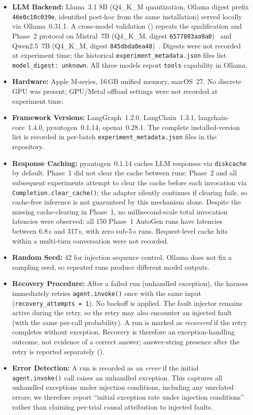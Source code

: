 \documentclass[make,article,submit,moreauthors,pdftex]{mdpi}
\newcommand{\Wrev}[1]{\texorpdfstring{{\color{RevisionOrange}#1}}{#1}}
\begin{document}
\begin{itemize}
  \item \textbf{LLM Backend:} Llama~3.1 8B (Q4\_K\_M quantization, Ollama digest prefix \texttt{46e0c10c039e}, identified post-hoc from the same installation) served locally via Ollama~0.31.1. A cross-model validation () repeats the qualification and Phase~2 protocol on Mistral~7B (Q4\_K\_M, digest \texttt{6577803aa9a0})~\cite{mistral2024} and Qwen2.5~7B (Q4\_K\_M, digest \texttt{845dbda0ea48})~\cite{qwen25_2024}. Digests were not recorded at experiment time; the historical \texttt{experiment\_metadata.json} files list \texttt{model\_digest:~unknown}. All three models report \texttt{tools} capability in Ollama.
  \item {\textbf{Hardware:} Apple M-series, 16\,GB unified memory, macOS~27. No discrete GPU was present; GPU/Metal offload settings were not recorded at experiment time.}
  \item {\textbf{Framework Versions:} LangGraph~1.2.0, LangChain~1.3.1, langchain-core~1.4.0, pyautogen~0.1.14, openai~0.28.1. The complete installed-version list is recorded in per-batch \texttt{experiment\_metadata.json} files in the repository.}
  \item \textbf{Response Caching:} pyautogen~0.1.14 caches LLM responses via \texttt{diskcache} by default. {Phase~1 did not clear the cache between runs; Phase~2 and all subsequent experiments attempt to clear the cache before each invocation via \texttt{Completion.clear\_cache()}; the adapter silently continues if clearing fails, so cache-free inference is not guaranteed by this mechanism alone. Despite the missing cache-clearing in Phase~1, no millisecond-scale total invocation latencies were observed: all 150 Phase~1 AutoGen runs have latencies between 6.8\,s and 317\,s, with zero sub-5\,s runs. Request-level cache hits within a multi-turn conversation were not recorded.}
  \item \textbf{Random Seed:} 42 for injection sequence control. Ollama does not fix a sampling seed, so repeated runs produce different model outputs.
  \item \textbf{Recovery Procedure:} After a failed run (unhandled exception), the harness immediately retries \texttt{agent.invoke()} once with the same input (\texttt{recovery\_attempts\,=\,1}). No backoff is applied. The fault injector remains active during the retry, so the retry may also encounter an injected fault (with the same per-call probability). A run is marked as \emph{recovered} if the retry completes without exception. \Wrev{Recovery is therefore an exception-handling outcome, not evidence of a correct answer; answer-string presence after the retry is reported separately (\Cref{tab:handling-vs-completion}).}
  \item \textbf{Error Detection:} A run is recorded as an \emph{error} if the initial \texttt{agent.invoke()} call raises an unhandled exception. This captures all unhandled exceptions under injection conditions, including any unrelated errors; we therefore report ``initial exception rate under injection conditions'' rather than claiming per-trial causal attribution to injected faults.
\end{itemize}
\end{document}
